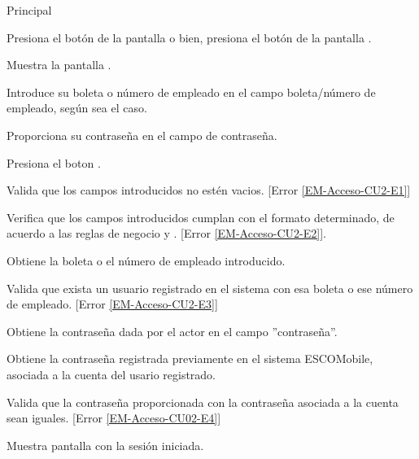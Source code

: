 	\begin{UCtrayectoria}{Principal}

		\UCpaso [\UCactor] Presiona el botón  de la pantalla  o bien, presiona el botón  de la pantalla .
		
		\UCpaso Muestra la pantalla . \label{l_Acceso_CU2_E1}
		
		\UCpaso[\UCactor] Introduce su boleta o número de empleado en el campo boleta/número de empleado, según sea el caso.
		
		\UCpaso[\UCactor] Proporciona su contraseña en el campo de contraseña.
		
		\UCpaso[\UCactor] Presiona el boton .
		
		\UCpaso Valida que los campos introducidos no estén vacios. [Error \ref{EM-Acceso-CU2-E1}]
		
		\UCpaso Verifica que los campos introducidos cumplan con el formato determinado, de acuerdo a las reglas de negocio  y . [Error \ref{EM-Acceso-CU2-E2}].
		
		\UCpaso Obtiene la boleta o el número de empleado introducido.
		
		\UCpaso Valida que exista un usuario registrado en el sistema con esa boleta o ese número de empleado. [Error \ref{EM-Acceso-CU2-E3}]

		\UCpaso Obtiene la contraseña dada por el actor en el campo ''contraseña''.
		
		\UCpaso Obtiene la contraseña registrada previamente en el sistema ESCOMobile, asociada a la cuenta del usario registrado.

		\UCpaso Valida que la contraseña proporcionada con la contraseña asociada a la cuenta sean iguales. [Error \ref{EM-Acceso-CU02-E4}]
		
		\UCpaso Muestra pantalla  con la sesión iniciada.
	\end{UCtrayectoria}
		
